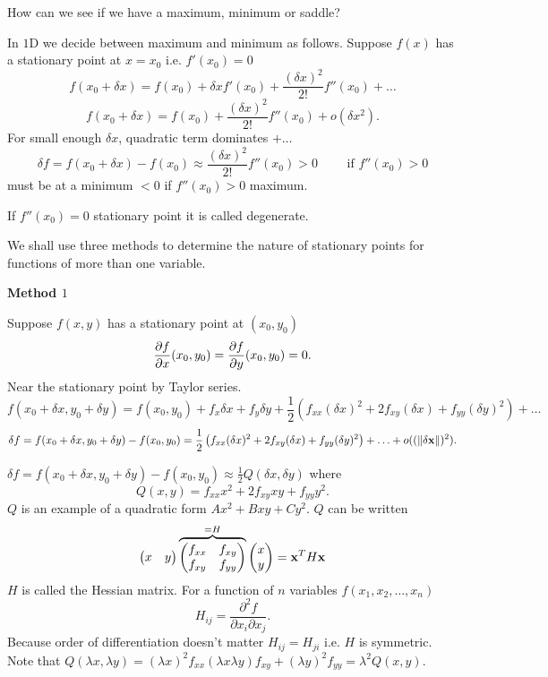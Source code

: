 \documentclass[10pt, a4paper]{article}
\begin{document}
How can we see if we have a maximum,
minimum or saddle?

In $1$D we decide between maximum and minimum as follows.
Suppose $f(x)$ has a stationary point at $x = x_0$ i.e. $f'(x_0) = 0$
\[
f(x_0 + \delta x) = f(x_0) + \delta xf'(x_0) + \frac{(\delta x) ^ 2}{2!}f''(x_0) + \dotsc
\]
\[
f(x_0 + \delta x) = f(x_0) + \frac{(\delta x) ^ 2}{2!}f''(x_0) + o(\delta x ^ 2).
\]
For small enough $\delta x$,
quadratic term dominates $+ \dotsc$
\[
\delta f = f(x_0 + \delta x) - f(x_0) \approx \frac{(\delta x) ^ 2}{2!}f''(x_0) > 0 \qquad\text{ if } f''(x_0) > 0
\]
must be at a minimum
$< 0$ if $f''(x_0) > 0$ maximum.

If $f''(x_0) = 0$ stationary point it is called degenerate.


We shall use three methods to determine the nature of stationary points for functions of more than one variable.

\textbf{Method $1$}

Suppose $f(x, y)$ has a stationary point at $(x_0, y_0)$
\[
\pd[f]{x}(x_0, y_0) = \pd[f]{y}(x_0, y_0) = 0.
\]
Near the stationary point by Taylor series.
\[
f(x_0 + \delta x, y_0 + \delta y) = f(x_0, y_0) + f_x\delta x + f_y\delta y + \frac{1}{2}\left(f_{xx}(\delta x) ^ 2 + 2f_{xy}(\delta x) + f_{yy}(\delta y) ^ 2\right) + \dotsc
\]
\[
\delta f = f(x_0 + \delta x, y_0 + \delta y) - f(x_0, y_0) = \frac{1}{2}\left(f_{xx}(\delta x) ^ 2 + 2f_{xy}(\delta x) + f_{yy}(\delta y) ^ 2\right) + \dotsc + o((\|\delta\mbf{x}\|) ^ 2).
\]

$\delta f = f(x_0 + \delta x, y_0 + \delta y) - f(x_0, y_0) \approx \frac{1}{2}Q(\delta x, \delta y)$
where
\[
Q(x, y) = f_{xx}x ^ 2 + 2f_{xy}xy + f_{yy}y ^ 2.
\]
$Q$ is an example of a quadratic form $Ax ^ 2 + Bxy + Cy ^ 2$.
$Q$ can be written
\[
\begin{pmatrix}
    x & y
\end{pmatrix}\overbrace{\begin{pmatrix}
    f_{xx} & f_{xy} \\
    f_{xy} & f_{yy}
\end{pmatrix}} ^ {= H}
\begin{pmatrix}
    x \\ y
\end{pmatrix} = \mbf{x} ^ TH\mbf{x}
\]
$H$ is called the Hessian matrix.
For a function of $n$ variables $f(x_1, x_2, \dotsc, x_n)$
\[
H_{ij} = \frac{\partial ^ 2f}{\partial x_i\partial x_j}.
\]
Because order of differentiation doesn't matter $H_{ij} = H_{ji}$ i.e. $H$ is symmetric.
Note that $Q(\lambda x, \lambda y) = (\lambda x) ^ 2 f_{xx}(\lambda x\lambda y)f_{xy} + (\lambda y) ^ 2f_{yy} = \lambda ^ 2Q(x, y)$.
\end{document}

